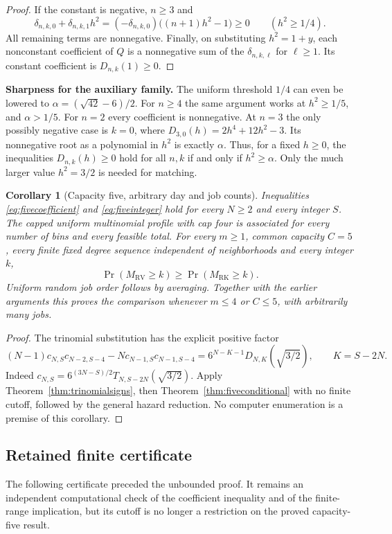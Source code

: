 \documentclass[11pt]{article}
\newtheorem{corollary}{Corollary}
\newcommand{\RV}{\mathrm{RV}}
\newcommand{\RK}{\mathrm{RK}}
\begin{document}
\begin{proof}
If the constant is negative, $n\geq3$ and
\[
 \delta_{n,k,0}+\delta_{n,k,1}h^2
 =(-\delta_{n,k,0})\bigl((n+1)h^2-1\bigr)\geq0
 \qquad(h^2\geq1/4).
\]
All remaining terms are nonnegative. Finally, on substituting
$h^2=1+y$, each nonconstant coefficient of $Q$ is a
nonnegative sum of the $\delta_{n,k,\ell}$ for $\ell\geq1$.
Its constant coefficient is $D_{n,k}(1)\geq0$.
\end{proof}

\noindent\textbf{Sharpness for the auxiliary family.}
The uniform threshold $1/4$ can even be lowered to
$\alpha=(\sqrt{42}-6)/2$. For $n\geq4$ the same argument works
at $h^2\geq1/5$, and $\alpha>1/5$. For $n=2$ every coefficient
is nonnegative. At $n=3$ the only possibly negative case is
$k=0$, where $D_{3,0}(h)=2h^4+12h^2-3$. Its nonnegative root
as a polynomial in $h^2$ is exactly $\alpha$. Thus, for a fixed
$h\geq0$, the inequalities $D_{n,k}(h)\geq0$ hold for all $n,k$
if and only if $h^2\geq\alpha$. Only the much larger value
$h^2=3/2$ is needed for matching.

\begin{corollary}[Capacity five, arbitrary day and job counts]\label{cor:capacityfive}
Inequalities \eqref{eq:fivecoefficient} and \eqref{eq:fiveinteger}
hold for every $N\geq2$ and every integer $S$.
The capped uniform multinomial profile with cap four is associated
for every number of bins and every feasible total.
For every $m\geq1$, common capacity $C=5$, every finite fixed
degree sequence independent of neighborhoods and every integer $k$,
\[
 \Pr(M_\RV\geq k)\geq\Pr(M_\RK\geq k).
\]
Uniform random job order follows by averaging. Together with the
earlier arguments this proves the comparison whenever $m\leq4$
or $C\leq5$, with arbitrarily many jobs.
\end{corollary}
\begin{proof}
The trinomial substitution has the explicit positive factor
\[
 (N-1)c_{N,S}c_{N-2,S-4}-N c_{N-1,S}c_{N-1,S-4}
 =6^{N-K-1}D_{N,K}(\sqrt{3/2}),\qquad K=S-2N.
\]
Indeed $c_{N,S}=6^{(3N-S)/2}T_{N,S-2N}(\sqrt{3/2})$.
Apply Theorem~\ref{thm:trinomialsigns}, then
Theorem~\ref{thm:fiveconditional} with no finite cutoff, followed
by the general hazard reduction. No computer enumeration is a
premise of this corollary.
\end{proof}

\subsection{Retained finite certificate}
The following certificate preceded the unbounded proof. It remains
an independent computational check of the coefficient inequality
and of the finite-range implication, but its cutoff is no longer
a restriction on the proved capacity-five result.
\end{document}

